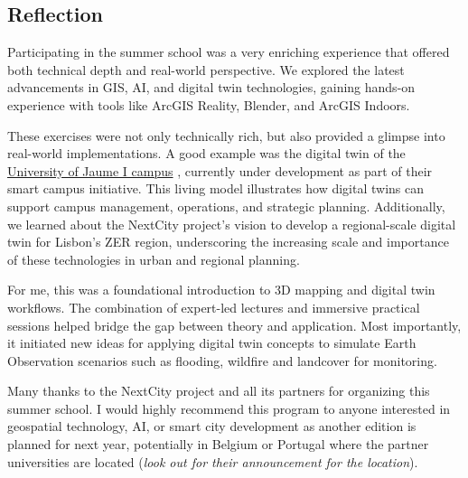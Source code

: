 \documentclass[
  letterpaper,
  DIV=11,
  numbers=noendperiod]{scrartcl}
\begin{document}
\subsection{\texorpdfstring{\textbf{Reflection}}{Reflection}}\label{reflection}

Participating in the summer school was a very enriching experience that
offered both technical depth and real-world perspective. We explored the
latest advancements in GIS, AI, and digital twin technologies, gaining
hands-on experience with tools like ArcGIS Reality, Blender, and ArcGIS
Indoors.

These exercises were not only technically rich, but also provided a
glimpse into real-world implementations. A good example was the digital
twin of the
\href{https://experience.arcgis.com/experience/6f6ff716866944ecaa2688888792864f/page/EN}{University
of Jaume I campus} , currently under development as part of their smart
campus initiative. This living model illustrates how digital twins can
support campus management, operations, and strategic planning.
Additionally, we learned about the NextCity project's vision to develop
a regional-scale digital twin for Lisbon's ZER region, underscoring the
increasing scale and importance of these technologies in urban and
regional planning.

For me, this was a foundational introduction to 3D mapping and digital
twin workflows. The combination of expert-led lectures and immersive
practical sessions helped bridge the gap between theory and application.
Most importantly, it initiated new ideas for applying digital twin
concepts to simulate Earth Observation scenarios such as flooding,
wildfire and landcover for monitoring.

Many thanks to the NextCity project and all its partners for organizing
this summer school. I would highly recommend this program to anyone
interested in geospatial technology, AI, or smart city development as
another edition is planned for next year, potentially in Belgium or
Portugal where the partner universities are located (\emph{look out for
their announcement for the location}).
\end{document}
